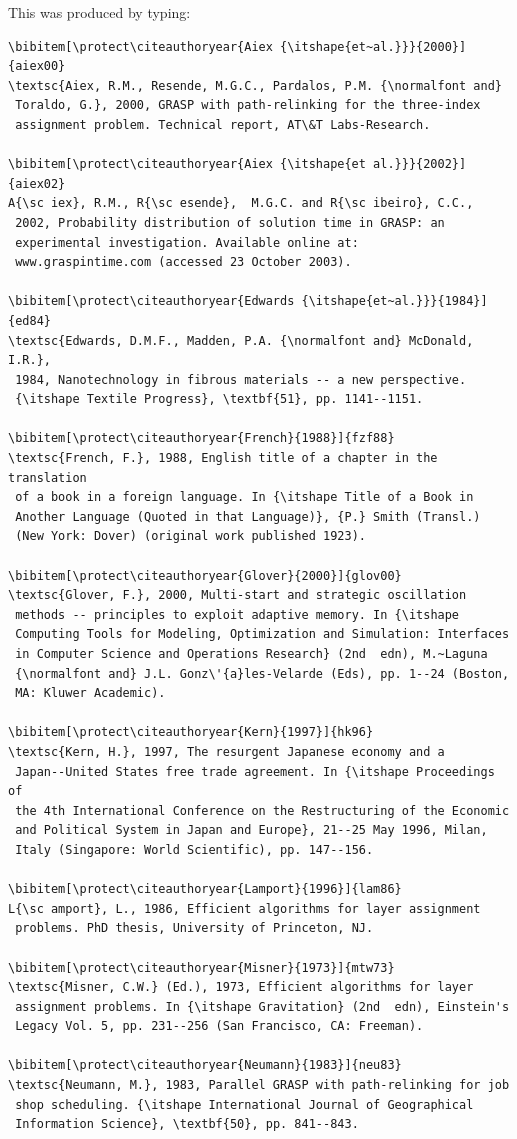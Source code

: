 \documentclass[]{tRSL2e}
\begin{document}
\bigskip
\noindent This was produced by typing:
\medskip
\begin{verbatim}
\bibitem[\protect\citeauthoryear{Aiex {\itshape{et~al.}}}{2000}]{aiex00}
\textsc{Aiex, R.M., Resende, M.G.C., Pardalos, P.M. {\normalfont and}
 Toraldo, G.}, 2000, GRASP with path-relinking for the three-index
 assignment problem. Technical report, AT\&T Labs-Research.

\bibitem[\protect\citeauthoryear{Aiex {\itshape{et al.}}}{2002}]{aiex02}
A{\sc iex}, R.M., R{\sc esende},  M.G.C. and R{\sc ibeiro}, C.C.,
 2002, Probability distribution of solution time in GRASP: an
 experimental investigation. Available online at:
 www.graspintime.com (accessed 23 October 2003).

\bibitem[\protect\citeauthoryear{Edwards {\itshape{et~al.}}}{1984}]{ed84}
\textsc{Edwards, D.M.F., Madden, P.A. {\normalfont and} McDonald, I.R.},
 1984, Nanotechnology in fibrous materials -- a new perspective.
 {\itshape Textile Progress}, \textbf{51}, pp. 1141--1151.

\bibitem[\protect\citeauthoryear{French}{1988}]{fzf88}
\textsc{French, F.}, 1988, English title of a chapter in the translation
 of a book in a foreign language. In {\itshape Title of a Book in
 Another Language (Quoted in that Language)}, {P.} Smith (Transl.)
 (New York: Dover) (original work published 1923).

\bibitem[\protect\citeauthoryear{Glover}{2000}]{glov00}
\textsc{Glover, F.}, 2000, Multi-start and strategic oscillation
 methods -- principles to exploit adaptive memory. In {\itshape
 Computing Tools for Modeling, Optimization and Simulation: Interfaces
 in Computer Science and Operations Research} (2nd  edn), M.~Laguna
 {\normalfont and} J.L. Gonz\'{a}les-Velarde (Eds), pp. 1--24 (Boston,
 MA: Kluwer Academic).

\bibitem[\protect\citeauthoryear{Kern}{1997}]{hk96}
\textsc{Kern, H.}, 1997, The resurgent Japanese economy and a
 Japan--United States free trade agreement. In {\itshape Proceedings of
 the 4th International Conference on the Restructuring of the Economic
 and Political System in Japan and Europe}, 21--25 May 1996, Milan,
 Italy (Singapore: World Scientific), pp. 147--156.

\bibitem[\protect\citeauthoryear{Lamport}{1996}]{lam86}
L{\sc amport}, L., 1986, Efficient algorithms for layer assignment
 problems. PhD thesis, University of Princeton, NJ.

\bibitem[\protect\citeauthoryear{Misner}{1973}]{mtw73}
\textsc{Misner, C.W.} (Ed.), 1973, Efficient algorithms for layer
 assignment problems. In {\itshape Gravitation} (2nd  edn), Einstein's
 Legacy Vol. 5, pp. 231--256 (San Francisco, CA: Freeman).

\bibitem[\protect\citeauthoryear{Neumann}{1983}]{neu83}
\textsc{Neumann, M.}, 1983, Parallel GRASP with path-relinking for job
 shop scheduling. {\itshape International Journal of Geographical
 Information Science}, \textbf{50}, pp. 841--843.
\end{verbatim}
\end{document}

